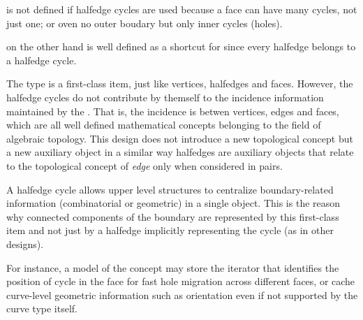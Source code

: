 { is not defined if halfedge cycles  are used because a face
can have many cycles, not just one; or oven no outer boudary but only inner cycles (holes).

 on the other hand is well defined as a shortcut for 
since every halfedge belongs to a halfedge cycle.

The type  is a first-class  item, just like vertices, halfedges and faces.
However, the halfedge cycles do not contribute  by themself to the incidence information 
maintained by the . That is, the incidence is betwen vertices, edges and faces,
which are all well defined mathematical concepts belonging to the field of algebraic topology.
This design does not introduce a new topological concept but a new
auxiliary object in a similar way halfedges are auxiliary objects that 
relate to the topological concept of {\em edge} only when considered in pairs.

A halfedge cycle allows upper level structures to centralize boundary-related information
(combinatorial or geometric) in a single object. This is the reason why 
connected components of the boundary are represented by this first-class  item 
and not just by a halfedge implicitly representing the cycle (as in other designs).

For instance, a model of the  concept  may store the iterator that identifies the position of
cycle in the face for fast hole migration across different faces, or cache curve-level geometric
information such as orientation even if not supported by the curve type itself.
}


